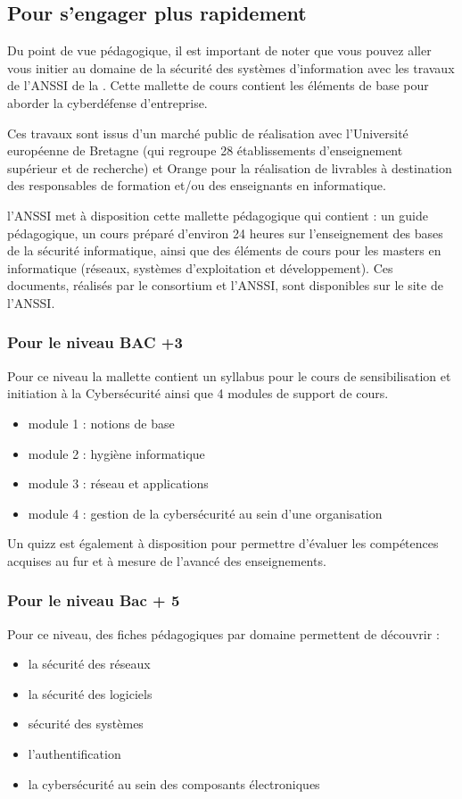 \subsection{Pour s'engager plus rapidement}

Du point de vue pédagogique, il est important de noter que vous pouvez aller vous initier au domaine de la sécurité des systèmes d'information avec les travaux de l'ANSSI de la . Cette mallette de cours contient les éléments de base pour aborder la cyberdéfense d'entreprise.

Ces travaux sont issus d'un marché public de réalisation avec l’Université européenne de Bretagne  (qui regroupe 28 établissements d’enseignement supérieur et de recherche) et Orange pour la réalisation de livrables à destination des responsables de formation et/ou des enseignants en informatique.

l’ANSSI met à disposition cette mallette pédagogique qui contient : un guide pédagogique, un cours préparé d’environ 24 heures sur l’enseignement des bases de la sécurité informatique, ainsi que des éléments de cours pour les masters en informatique (réseaux, systèmes d’exploitation et développement).
Ces documents, réalisés par le consortium et l’ANSSI, sont disponibles sur le site de l'ANSSI.
 

\subsubsection {Pour le niveau BAC +3}

Pour ce niveau la mallette contient un syllabus pour le cours de sensibilisation et initiation à la Cybersécurité ainsi que 4 modules de support de cours.

\begin{itemize}
	\item module 1 :  notions de base
	\item module 2  :  hygiène informatique
	\item module 3 :  réseau et applications
	\item module 4 :  gestion de la cybersécurité au sein d’une organisation
\end{itemize}
Un quizz est également à disposition pour permettre d’évaluer les compétences acquises au fur et à mesure de l’avancé des enseignements.

\subsubsection{Pour le niveau Bac + 5} 

Pour ce niveau, des fiches pédagogiques par domaine permettent de découvrir :
\begin{itemize}
	\item la sécurité des réseaux
	\item la sécurité des logiciels
	\item sécurité des systèmes
	\item l’authentification
	\item la cybersécurité au sein des composants électroniques
\end{itemize}


